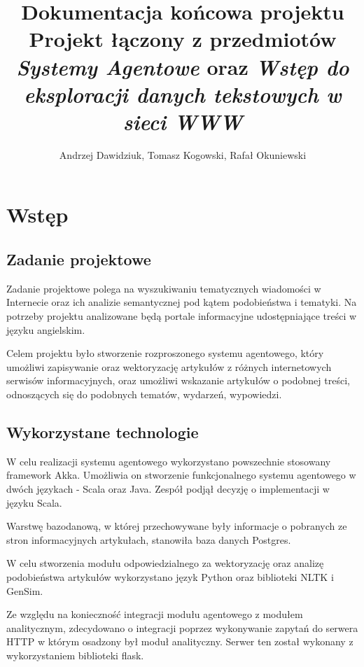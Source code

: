 \documentclass[a4paper]{article}
\title{\Large{Dokumentacja końcowa projektu} \\
Projekt łączony z przedmiotów \textit{Systemy Agentowe} oraz \textit{Wstęp do eksploracji danych tekstowych w sieci WWW}}
\author{Andrzej Dawidziuk, Tomasz Kogowski, Rafał Okuniewski}
\begin{document}
\maketitle

\section{Wstęp}

\subsection{Zadanie projektowe}
\par Zadanie projektowe polega na wyszukiwaniu tematycznych wiadomości w Internecie oraz ich analizie semantycznej pod kątem podobieństwa i tematyki. Na potrzeby projektu analizowane będą portale informacyjne udostępniające treści w języku angielskim.
\par Celem projektu było stworzenie rozproszonego systemu agentowego, który umożliwi zapisywanie oraz wektoryzację artykułów z różnych internetowych serwisów informacyjnych, oraz umożliwi wskazanie artykułów o podobnej treści, odnoszących się do podobnych tematów, wydarzeń, wypowiedzi.

\subsection{Wykorzystane technologie}

\par W celu realizacji systemu agentowego wykorzystano powszechnie stosowany framework Akka\cite{akka}. Umożliwia on stworzenie funkcjonalnego systemu agentowego w dwóch językach - Scala oraz Java. Zespół podjął decyzję o implementacji w języku Scala.
\par Warstwę bazodanową, w której przechowywane były informacje o pobranych ze stron informacyjnych artykułach, stanowiła baza danych Postgres.
\par W celu stworzenia modułu odpowiedzialnego za wektoryzację oraz analizę podobieństwa artykułów wykorzystano język Python oraz biblioteki NLTK i GenSim.
\par Ze względu na konieczność integracji modułu agentowego z modułem analitycznym, zdecydowano o integracji poprzez wykonywanie zapytań do serwera HTTP w którym osadzony był moduł analityczny. Serwer ten został wykonany z wykorzystaniem biblioteki flask.




\end{document}
